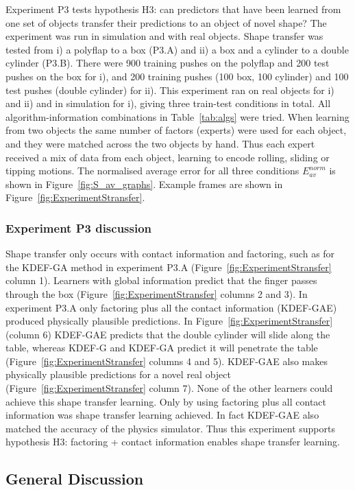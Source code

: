 Experiment P3 tests hypothesis H3: can predictors that have been learned from one set of objects transfer their predictions to an object of novel shape? The experiment was run in simulation and with real objects. Shape transfer was tested from i) a polyflap to a box (P3.A) and ii) a box and a cylinder to a double cylinder (P3.B). There were 900 training pushes on the polyflap and 200 test pushes on the box for i), and 200 training pushes (100 box, 100 cylinder) and 100 test pushes (double cylinder) for ii). This experiment ran on real objects for i) and ii) and in simulation for i), giving three train-test conditions in total. All algorithm-information combinations in Table~\ref{tab:algs} were tried. When learning from two objects the same number of factors (experts) were used for each object, and they were matched across the two objects by hand. Thus each expert received a mix of data from each object, learning to encode rolling, sliding or tipping motions.  The normalised average error for all three conditions $E_{av}^{norm}$ is shown in Figure~\ref{fig:S_av_graphs}. Example frames are shown in Figure~\ref{fig:ExperimentStransfer}.

\subsubsection{Experiment P3 discussion} Shape transfer only occurs with contact information and factoring, such as for the
KDEF-GA method in experiment P3.A (Figure~\ref{fig:ExperimentStransfer} column 1).  Learners with global information predict that the finger passes through the box (Figure~\ref{fig:ExperimentStransfer} columns 2 and 3). In experiment P3.A only factoring plus all the contact information (KDEF-GAE) produced physically plausible predictions. In Figure~\ref{fig:ExperimentStransfer} (column 6) KDEF-GAE predicts that the double cylinder will slide along the table, whereas KDEF-G and KDEF-GA predict it will penetrate the table (Figure~\ref{fig:ExperimentStransfer} columns 4 and 5). KDEF-GAE also makes physically plausible predictions for a novel real object 
(Figure~\ref{fig:ExperimentStransfer} column 7). None of the other learners could achieve this shape transfer learning. Only by using factoring plus all contact information was shape transfer learning achieved. In fact KDEF-GAE also matched the accuracy of the physics simulator. Thus this experiment supports hypothesis H3: factoring + contact information enables shape transfer learning.

\subsection{General Discussion} 

